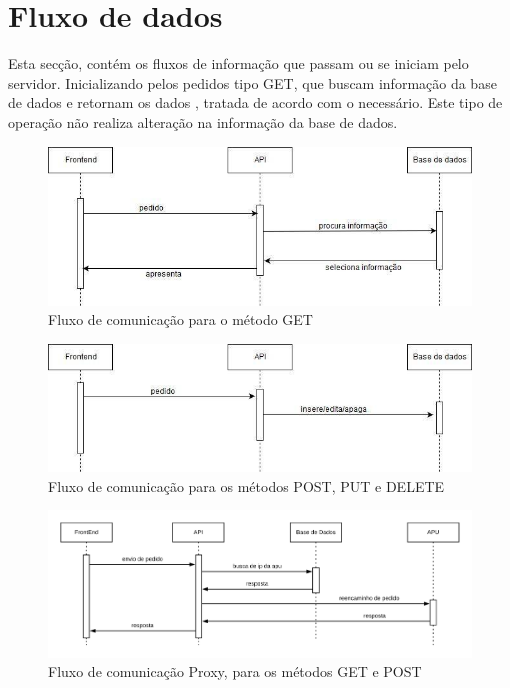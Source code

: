 \section{Fluxo de dados}
Esta secção, contém os fluxos de informação que passam ou se iniciam pelo servidor.\newline
Inicializando pelos pedidos tipo GET, que buscam informação da base de dados e retornam os dados , tratada de acordo com o necessário. Este tipo de operação não realiza alteração na informação da base de dados.
\begin{figure}[!ht]
    \centering
    \includegraphics[width=\textwidth]{images/fluxo1.jpg}
    \caption{Fluxo de comunicação para o método GET}
    \label{fig:get}
\end{figure}
\begin{figure}[!ht]
    \centering
    \includegraphics[width=\textwidth]{images/fluxo2.jpg}
    \caption{Fluxo de comunicação para os métodos POST, PUT e DELETE}
    \label{fig:post}
\end{figure}
\newpage
\begin{figure}[!ht]
    \centering
    \includegraphics[width=\textwidth]{images/fluxo3.png}
    \caption{Fluxo de comunicação Proxy, para os métodos GET e POST}
    \label{fig:proxy}
\end{figure}
